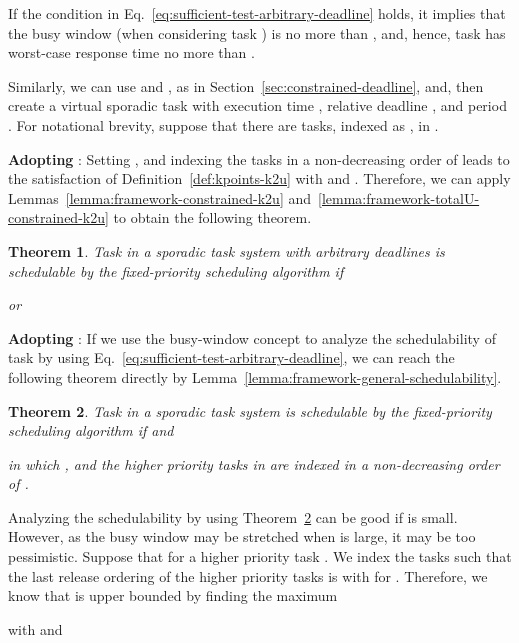 \documentclass[10pt,conference]{IEEEtran}
\newcommand{\frameworkkq}[1]{}
\newcommand{\frameworkku}[1]{}
\newtheorem{theorem}{Theorem}
\begin{document}
If the condition in Eq.~\eqref{eq:sufficient-test-arbitrary-deadline} holds,
it implies that the busy window (when considering task ) is no
more than , and, hence, task  has worst-case response
time no more than .

Similarly, we can use  and , as in
Section~\ref{sec:constrained-deadline}, and, then create a virtual
sporadic task  with execution time ,
relative deadline , and period . 
For notational brevity, suppose that there are  tasks, indexed
as , in
. 


\noindent\textbf{Adopting \frameworkku{}}: \hspace{1cm}
Setting , and indexing the
tasks in a non-decreasing order of  leads to the satisfaction of
Definition~\ref{def:kpoints-k2u} with  and . Therefore, we can apply Lemmas~\ref{lemma:framework-constrained-k2u}
and~\ref{lemma:framework-totalU-constrained-k2u} to obtain the
following theorem. 

\begin{theorem}
\label{theorem:sporadic-arbitrary-k2u}
Task  in a sporadic task system with arbitrary deadlines is
schedulable by the fixed-priority scheduling algorithm if

or

\end{theorem}


\noindent\textbf{Adopting \frameworkkq{}}: \hspace{1cm}  If we use the
busy-window concept to analyze the schedulability of task  by
using Eq.~\eqref{eq:sufficient-test-arbitrary-deadline}, we can reach
the following theorem directly by
Lemma~\ref{lemma:framework-general-schedulability}.
\begin{theorem}
\label{theorem:schedulability-sporadic-arbitrary}
Task  in a sporadic task system is
schedulable by the fixed-priority scheduling algorithm if
 and

in which , and the  higher priority tasks in  are indexed
in a non-decreasing order of .
\end{theorem}


Analyzing the schedulability by using
Theorem~\ref{theorem:schedulability-sporadic-arbitrary} can be good if
 is small. However, as the busy window may be
stretched when  is large, it may be too pessimistic.  
Suppose that 
for a higher priority task . We index the tasks such that the
last release ordering  of the  higher priority tasks is with
 for . Therefore, we know that
 is upper bounded by finding the maximum
  
with  and
  
\end{document}
